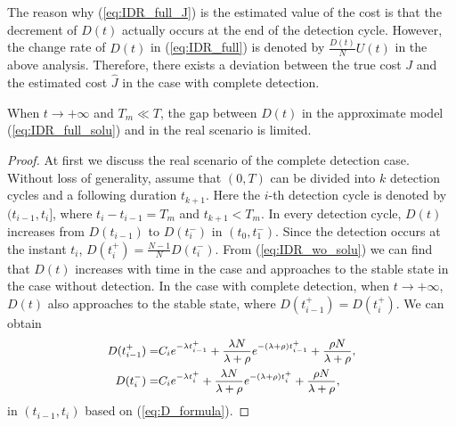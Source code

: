 The reason why (\ref{eq:IDR_full_J}) is the estimated value of the cost
is that the decrement of $D(t)$ actually occurs
at the end of the detection cycle.
However, the change rate of $D(t)$ in (\ref{eq:IDR_full})
is denoted by $\frac{D(t)}{N}U(t)$ in the above analysis.
Therefore, there exists a deviation between the true cost $J$ and
the estimated cost $\hat{J}$ in the case with complete detection.
\begin{lem}\label{lem:Dstable}
When $t \rightarrow +\infty$ and $T_{m} \ll T$,
the gap between $D(t)$
in the approximate model (\ref{eq:IDR_full_solu})
and in the real scenario is limited.
\end{lem}
\begin{proof}
At first we discuss the real scenario of the complete detection case.
Without loss of generality,
assume that $(0, T)$ can be divided into $k$ detection cycles
and a following duration $t_{k+1}$.
Here the $i$-th detection cycle is denoted by $(t_{i-1}, t_{i}]$,
where $t_{i} - t_{i-1} = T_{m}$ and $t_{k+1} < T_{m}$.
In every detection cycle,
$D(t)$ increases from $D(t_{i-1})$ to $D(t_{i}^{-})$
in $(t_{0}, t_{1}^{-})$.
Since the detection occurs at the instant $t_{i}$,
$D(t_{i}^{+}) = \frac{N-1}{N}D(t_{i}^{-})$.
From (\ref{eq:IDR_wo_solu}) we can find that $D(t)$ increases with time in the case
and approaches to the stable state in the case without detection.
In the case with complete detection,
when $t \rightarrow +\infty$,
$D(t)$ also approaches to the stable state,
where $D(t_{i-1}^{+}) = D(t_{i}^{+})$.
We can obtain
\begin{equation}
\begin{small}
\nonumber
\begin{aligned}
D(t_{i-1}^{+}) = & C_{i} e^{-\lambda t_{i-1}^{+}}
+ \frac{\lambda N}{\lambda + \rho} e^{-(\lambda+\rho)t_{i-1}^{+}}
+ \frac{\rho N}{\lambda+\rho}, \\
D(t_{i}^{-}) = & C_{i} e^{-\lambda t_{i}^{+}}
+ \frac{\lambda N}{\lambda + \rho} e^{-(\lambda+\rho)t_{i}^{+}}
+ \frac{\rho N}{\lambda+\rho},
\end{aligned}
\end{small}
\end{equation}
in $(t_{i-1}, t_{i})$ based on (\ref{eq:D_formula}).


\end{proof}
